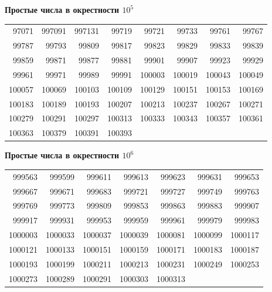 \documentclass{mai_book}
\begin{document}
{\newpage
\thispagestyle{empty}
 \begin{center}
	{\large\textbf{Простые числа в окрестности $10^{5}$}}
\end{center}
\begin{tabular}{rrrrrrrr} %
97071 & 997091 & 997131 & 99719 & 99721 &  99733 &  99761 &  99767 \\ 
99787 & 99793 & 99809 &  99817 &  99823 & 99829 &  99833 &  99839 \\
99859 & 99871 & 99877 & 99881 &  99901 &  99907 &  99923 &  99929 \\
99961 & 99971 & 99989 & 99991 & 100003 &  100019 & 100043 & 100049 \\
100057 &  100069 &  100103 &  100109 &
100129 & 100151 &  100153 &  100169 \\ 100183 & 100189 &  100193 &  100207 &  100213 & 100237 & 100267 &  100271 \\
100279 &  100291 &  100297 &  100313 &  100333 &  100343 & 100357 & 100361 \\  100363 &  100379 & 100391 &  100393
\end{tabular}

 \begin{center}
	{\large\textbf{Простые числа в окрестности $10^{6}$}}
\end{center}
\begin{tabular}{rrrrrrr}
	999563 & 999599 &  999611 &  999613 &  999623 &  999631 &  999653 \\
	999667 &  999671 &  999683 &  999721 &  999727 &  999749 &  999763 \\
	999769 &  999773 &  999809 &  999853 &  999863 &  999883 &  999907 \\
	999917 &  999931 &  999953 &  999959 &  999961 &  999979 &  999983 \\
	1000003 &  1000033 &  1000037 &  1000039 &  1000081 &  1000099 &  1000117 \\
	1000121 &  1000133 &  1000151 &  1000159 &  1000171 &  1000183 &  1000187 \\
	1000193 &  1000199 &  1000211 &  1000213 &  1000231 &  1000249 &  1000253 \\
	1000273 & 1000289 &  1000291 &  1000303 &  1000313
\end{tabular}

}
\end{document}
